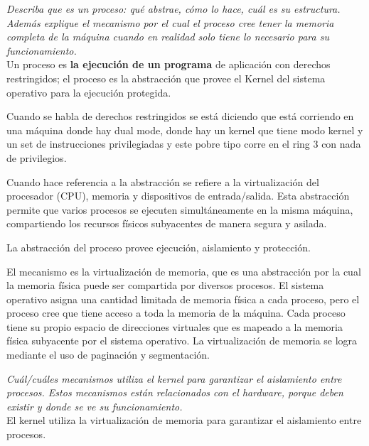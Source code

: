 \documentclass[../main.tex]{subfiles}
\begin{document}
    \begin{exercise}
        \textit{Describa que es un proceso: qué abstrae, cómo lo hace, cuál es su estructura. Además explique el mecanismo por el cual el proceso cree tener la memoria completa de la máquina cuando en realidad solo tiene lo necesario para su funcionamiento.}\\

        Un proceso es \textbf{la ejecución de un programa} de aplicación con derechos restringidos; el proceso es la abstracción que provee el Kernel del sistema operativo para la ejecución protegida.

        Cuando se habla de derechos restringidos se está diciendo que está corriendo en una máquina donde hay dual mode, donde hay un kernel que tiene modo kernel y un set de instrucciones privilegiadas y este pobre tipo corre en el ring 3 con nada de privilegios.

        Cuando hace referencia a la abstracción se refiere a la virtualización del procesador (CPU), memoria y dispositivos de entrada/salida. Esta abstracción permite que varios procesos se ejecuten simultáneamente en la misma máquina, compartiendo los recursos físicos subyacentes de manera segura y asilada.

        La abstracción del proceso provee ejecución, aislamiento y protección.

        El mecanismo es la virtualización de memoria, que es una abstracción por la cual la memoria física puede ser compartida por diversos procesos.
        El sistema operativo asigna una cantidad limitada de memoria física a cada proceso, pero el proceso cree que tiene acceso a toda la memoria de la máquina.
        Cada proceso tiene su propio espacio de direcciones virtuales que es mapeado a la memoria física subyacente por el sistema operativo.
        La virtualización de memoria se logra mediante el uso de paginación y segmentación.
    \end{exercise}

    \begin{exercise}
        \textit{Cuál/cuáles mecanismos utiliza el kernel para garantizar el aislamiento entre procesos. Estos mecanismos están relacionados con el hardware, porque deben existir y donde se ve su funcionamiento.}\\

        El kernel utiliza la virtualización de memoria para garantizar el aislamiento entre procesos.
    \end{exercise}
\end{document}
